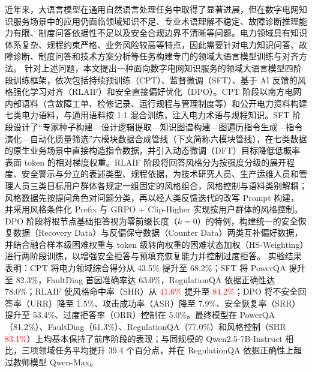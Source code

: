 \documentclass[fontset=fandol,type=master,campus=shenzhen,etitleauto=true]{hithesisbook}
\newcommand{\rev}[1]{\textcolor{red}{#1}}
\begin{document}
\frontmatter

\begin{cabstract}
近年来，大语言模型在通用自然语言处理任务中取得了显著进展，但在数字电网知识服务场景中的应用仍面临领域知识不足、专业术语理解不稳定、故障诊断推理能力有限、制度问答依据性不足以及安全合规边界不清晰等问题。电力领域具有知识体系复杂、规程约束严格、业务风险较高等特点，因此需要针对电力知识问答、故障诊断、制度问答和技术方案分析等任务构建专门的领域大语言模型训练与对齐方法。
针对上述问题，本文提出一种面向数字电网知识服务的领域大语言模型四阶段训练框架，依次包括持续预训练（CPT）、监督微调（SFT）、基于 AI 反馈的风格强化学习对齐（RLAIF）和安全直接偏好优化（DPO）。CPT 阶段以南方电网内部语料（含故障工单、检修记录、运行规程与管理制度等）和公开电力资料构建七类电力语料，与通用语料按 1:1 混合训练，注入电力术语与规程知识。SFT 阶段设计了“专家种子构建—设计逻辑提取—知识图谱构建—图遍历指令生成—指令演化—自动化质量筛选”六模块数据合成管线（下文简称六模块管线），在七类数据的原生业务场景中直接构造指令数据，并引入动态微调（DFT）目标降低低概率表面 token 的相对梯度权重。RLAIF 阶段将回答风格分为按强度分级的展开程度、安全警示与分立的表述类型、规程依据，为技术研究人员、生产运维人员和管理人员三类目标用户群体各规定一组固定的风格组合，风格控制与语料类别解耦；风格数据先按提问角色对问题分类，再以经人类反馈迭代的改写 Prompt 构建，并采用风格条件化 Prefix 与 GRPO + Clip-Higher 实现按用户群体的风格控制。DPO 阶段将根节点基础拒答视为零前缀长度（$k=0$）的特例，构建统一的安全恢复数据（Recovery Data）与反偏保守数据（Counter Data）两类互补偏好数据，并结合融合样本级困难权重与 token 级转向权重的困难状态加权（HS-Weighting）进行两阶段训练，以增强安全拒答与预填充恢复能力并控制过度拒答。
实验结果表明：CPT 将电力领域综合得分从 43.5\% 提升至 68.2\%；SFT 将 PowerQA 提升至 82.3\%，FaultDiag 首因准确率达 63.0\%，RegulationQA 依据正确性达 78.0\%；RLAIF 使风格命中率（SHR）从 \rev{41.6\%} 提升至 \rev{84.2\%}；DPO 将不安全回答率（URR）降至 1.5\%、攻击成功率（ASR）降至 7.9\%、安全恢复率（SRR）提升至 53.4\%、过度拒答率（ORR）控制在 5.0\%。最终模型在 PowerQA（81.2\%）、FaultDiag（61.3\%）、RegulationQA（77.0\%）和风格控制（SHR \rev{83.1\%}）上均基本保持了前序阶段的表现；与同规模的 Qwen2.5-7B-Instruct 相比，三项领域任务平均提升 39.4 个百分点，并在 RegulationQA 依据正确性上超过教师模型 Qwen-Max。
\end{cabstract}
\end{document}
